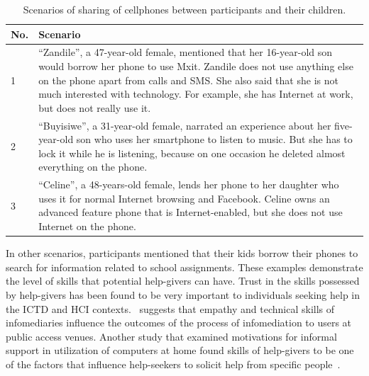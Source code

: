 \begin{table}[h!]
\begin{center}
    \caption{Scenarios of sharing of cellphones between participants and their children.}
    \label{table:phone_sharing_contextual}
	\begin{tabular}{|p{1cm}|p{12cm}|}
		\hline
		 \textbf{No.}&\textbf{Scenario}\\
	\hline
	1&``Zandile'', a 47-year-old female, mentioned that her 16-year-old son would borrow her phone to use Mxit. Zandile does not use anything else on the phone apart from calls and SMS. She also said that she is not much interested with technology. For example, she has Internet at work, but does not really use it.\\
	\hline
  2& ``Buyisiwe'', a 31-year-old female, narrated an experience about her five-year-old son who uses her smartphone to listen to music. But she has to lock it while he is listening, because on one occasion he deleted almost everything on the phone.\\
  \hline 
  3&``Celine'', a 48-years-old female, lends her phone to her daughter who uses it for normal Internet browsing and Facebook. Celine owns an advanced feature phone that is Internet-enabled, but she does not use Internet on the phone.\\
  \hline
	\end{tabular}
  \end{center}
\end{table}
In other scenarios, participants mentioned that their kids borrow their phones to search for information related to school assignments. These examples demonstrate the level of skills that potential help-givers can have. Trust in the skills possessed by help-givers has been found to be very important to individuals seeking help in the ICTD and HCI contexts.~\cite{ramirez2013infomediaries} suggests that empathy and technical skills of infomediaries influence the outcomes of the process of infomediation to users at public access venues. Another study that examined motivations for informal support in utilization of computers at home found skills of help-givers to be one of the factors that influence help-seekers to solicit help from specific people~\citep{poole:chh}. 
